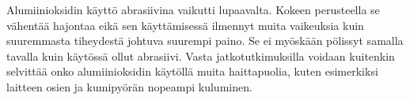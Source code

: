\documentclass[12pt,a4paper,finnish]{tutthesis}
\begin{document}
Alumiinioksidin käyttö abrasiivina vaikutti lupaavalta. Kokeen perusteella se vähentää hajontaa eikä sen käyttämisessä ilmennyt muita vaikeuksia kuin suuremmasta tiheydestä johtuva suurempi paino. Se ei myöskään pölissyt samalla tavalla kuin käytössä ollut abrasiivi. Vasta jatkotutkimuksilla voidaan kuitenkin selvittää onko alumiinioksidin käytöllä muita haittapuolia, kuten esimerkiksi laitteen osien ja kumipyörän nopeampi kuluminen.























\end{document}
